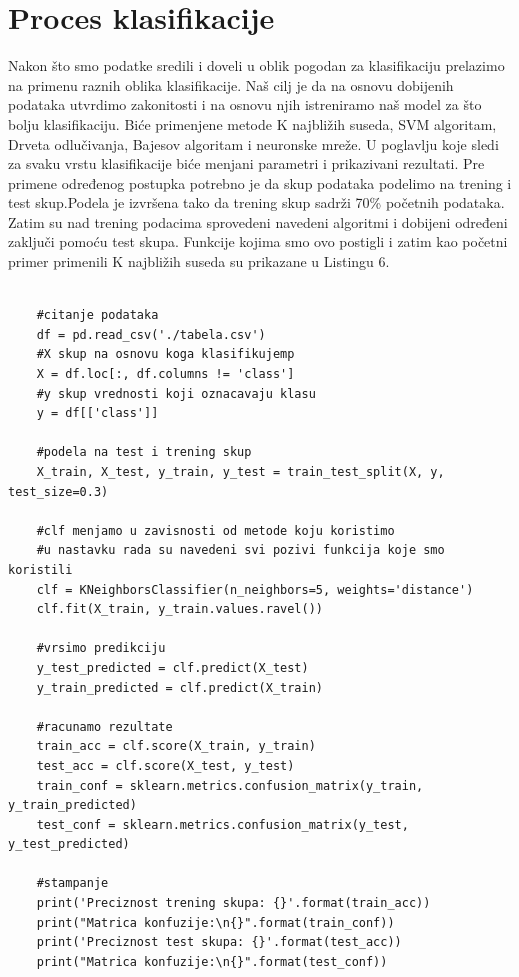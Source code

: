 \documentclass[14pt]{extarticle}
\begin{document}
\section{Proces klasifikacije}
\label{Klasifikacija}

Nakon što smo podatke sredili i doveli u oblik pogodan za klasifikaciju prelazimo na primenu raznih oblika klasifikacije. Naš cilj je da na osnovu dobijenih podataka utvrdimo zakonitosti i na osnovu njih istreniramo naš model za što bolju klasifikaciju. Biće primenjene metode K najbližih suseda, SVM algoritam, Drveta odlučivanja, Bajesov algoritam i neuronske mreže. U poglavlju koje sledi za svaku vrstu klasifikacije biće menjani parametri i prikazivani rezultati. Pre primene određenog postupka potrebno je da skup podataka podelimo na trening i test skup.Podela je izvršena tako da trening skup sadrži 70\% početnih podataka. Zatim su nad trening podacima sprovedeni navedeni algoritmi i dobijeni određeni zaključi pomoću test skupa. Funkcije kojima smo ovo postigli i zatim kao početni primer primenili K najbližih suseda su prikazane u Listingu 6. 

\begin{lstlisting}[caption={Klasifikacija},frame=single, label=simple]

    #citanje podataka
    df = pd.read_csv('./tabela.csv')
    #X skup na osnovu koga klasifikujemp
    X = df.loc[:, df.columns != 'class']
    #y skup vrednosti koji oznacavaju klasu
    y = df[['class']]

    #podela na test i trening skup
    X_train, X_test, y_train, y_test = train_test_split(X, y, test_size=0.3)

    #clf menjamo u zavisnosti od metode koju koristimo
    #u nastavku rada su navedeni svi pozivi funkcija koje smo koristili
    clf = KNeighborsClassifier(n_neighbors=5, weights='distance')
    clf.fit(X_train, y_train.values.ravel())
    
    #vrsimo predikciju
    y_test_predicted = clf.predict(X_test)
    y_train_predicted = clf.predict(X_train)
    
    #racunamo rezultate
    train_acc = clf.score(X_train, y_train)
    test_acc = clf.score(X_test, y_test)
    train_conf = sklearn.metrics.confusion_matrix(y_train, y_train_predicted)
    test_conf = sklearn.metrics.confusion_matrix(y_test, y_test_predicted)  
    
    #stampanje
    print('Preciznost trening skupa: {}'.format(train_acc))
    print("Matrica konfuzije:\n{}".format(train_conf))
    print('Preciznost test skupa: {}'.format(test_acc))
    print("Matrica konfuzije:\n{}".format(test_conf))


\end{lstlisting}
\end{document}
